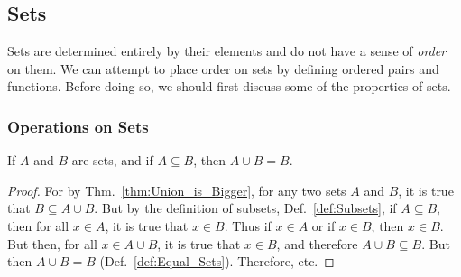 \documentclass[crop=false,class=book,oneside]{standalone}
\begin{document}
        \subsection{Sets}
            Sets are determined entirely by their elements and do
            not have a sense of \textit{order} on them. We can
            attempt to place order on sets by defining ordered
            pairs and functions. Before doing so, we should first
            discuss some of the properties of sets.
            \subsubsection{Operations on Sets}
                \begin{theorem}
                    If $A$ and $B$ are sets, and if
                    $A\subseteq{B}$, then $A\cup{B}=B$.
                \end{theorem}
                \begin{proof}
                    For by Thm.~\ref{thm:Union_is_Bigger},
                    for any two sets $A$ and $B$, it is true that
                    $B\subseteq{A}\cup{B}$. But by the definition of
                    subsets, Def.~\ref{def:Subsets},
                    if $A\subseteq{B}$, then for all $x\in{A}$, it
                    is true that $x\in{B}$.
                    Thus if $x\in{A}$ or if $x\in{B}$, then
                    $x\in{B}$. But then, for all $x\in{A}\cup{B}$,
                    it is true that $x\in{B}$, and therefore
                    $A\cup{B}\subseteq{B}$. But then $A\cup{B}=B$
                    (Def.~\ref{def:Equal_Sets}). Therefore, etc.
                \end{proof}
\end{document}
